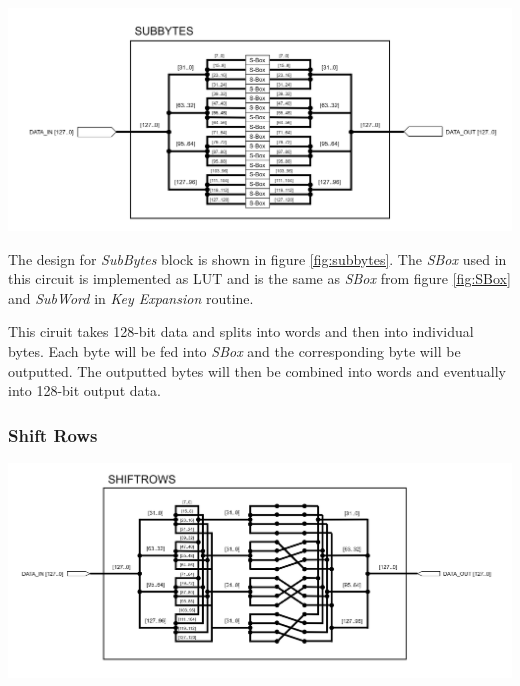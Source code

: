 \documentclass[a4paper, 10pt]{article}
\newenvironment{Figure}
    {\par\medskip\noindent\minipage{\linewidth}}
    {\endminipage\par\medskip}
\begin{document}
\begin{multicols}{2}
            \noindent
            \begin{Figure}
                \centering
                \includegraphics[width=\linewidth]{SubBytes.png}
                \label{fig:subbytes}
            \end{Figure}

            The design for \textit{SubBytes} block is shown in figure \ref{fig:subbytes}. The \textit{SBox} used in this circuit is implemented as LUT and is the same as \textit{SBox} from figure \ref{fig:SBox} and \textit{SubWord} in \textit{Key Expansion} routine.

            This ciruit takes 128-bit data and splits into words and then into individual bytes. Each byte will be fed into \textit{SBox} and the corresponding byte will be outputted. The outputted bytes will then be combined into words and eventually into 128-bit output data.

            \subsubsection{Shift Rows}

            \noindent
            \begin{Figure}
                \centering
                \includegraphics[width=\linewidth]{ShiftRows.png}
                \label{fig:shiftrows}
            \end{Figure}


\end{multicols}
\end{document}
